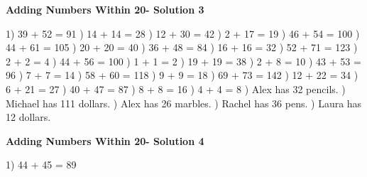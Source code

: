\documentclass{article}%
\begin{document}
\newpage%
\large%
\begin{center}%
\textbf{Adding Numbers Within 20- Solution 3}%
\newline%
\end{center} \normalsize%
1) 39 + 52 = 91%
) 14 + 14 = 28%
) 12 + 30 = 42%
) 2 + 17 = 19%
) 46 + 54 = 100%
) 44 + 61 = 105%
) 20 + 20 = 40%
) 36 + 48 = 84%
) 16 + 16 = 32%
) 52 + 71 = 123%
) 2 + 2 = 4%
) 44 + 56 = 100%
) 1 + 1 = 2%
) 19 + 19 = 38%
) 2 + 8 = 10%
) 43 + 53 = 96%
) 7 + 7 = 14%
) 58 + 60 = 118%
) 9 + 9 = 18%
) 69 + 73 = 142%
) 12 + 22 = 34%
) 6 + 21 = 27%
) 40 + 47 = 87%
) 8 + 8 = 16%
) 4 + 4 = 8%
) Alex has 32 pencils.%
) Michael has 111 dollars.%
) Alex has 26 marbles.%
) Rachel has 36 pens.%
) Laura has 12 dollars.%
\newline%
\newpage%
\large%
\begin{center}%
\textbf{Adding Numbers Within 20- Solution 4}%
\newline%
\end{center} \normalsize%
1) 44 + 45 = 89%
\newline%
\end{document}
